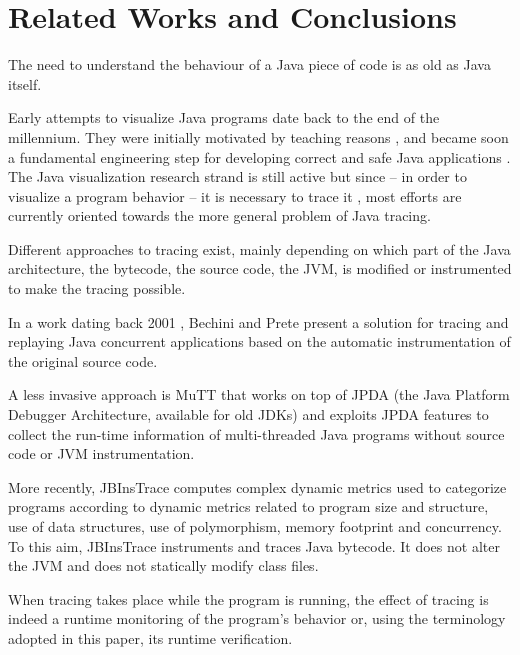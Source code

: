 \section{Related Works and Conclusions}
\label{rel-concl}

The need to understand the behaviour of a Java piece of code is as old as Java itself. 

Early attempts to visualize Java programs date back to the end of the millennium. They were initially motivated by teaching reasons \cite{dershem1999java}, and became soon a fundamental engineering step for developing correct and safe Java applications \cite{DBLP:conf/wcre/Systa00,DBLP:conf/dagstuhl/PauwJMSVY01}. The Java visualization research strand is still active \cite{DBLP:journals/spe/JayaramanJL17,DBLP:journals/spe/PJJS21} but since -- in order to visualize a program behavior -- it is necessary to trace it \cite{DBLP:conf/dagstuhl/Mehner01}, most efforts are currently oriented towards the more general problem of Java tracing.

Different approaches to tracing exist, mainly depending on which part of the Java architecture, the bytecode, the source code, the JVM, is modified or instrumented to make the tracing possible.

In a work dating back 2001 \cite{DBLP:journals/fgcs/BechiniP01}, Bechini and Prete present a solution for tracing and replaying Java concurrent applications based on the automatic instrumentation of the original source code.

A less invasive approach is MuTT \cite{DBLP:conf/ACISicis/LiuX09} that works on top of JPDA (the Java Platform Debugger Architecture, available for old JDKs) and exploits JPDA features to collect the run-time information of multi-threaded Java programs without source code or JVM instrumentation.

More recently, JBInsTrace \cite{DBLP:journals/scp/CasertaZ14} computes complex dynamic metrics used to categorize programs according to dynamic metrics related to program size and structure, use of data structures, use of
polymorphism, memory footprint and concurrency. 
To this aim, JBInsTrace instruments and traces Java bytecode. It does not alter the JVM and does not statically modify class files. 

When tracing takes place while the program is running, the effect of tracing is indeed a runtime monitoring of the program's behavior or, using the terminology adopted in this paper, its runtime verification.

